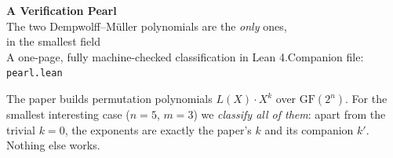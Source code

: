 \documentclass[11pt]{article}
\newcommand{\GF}[1]{\mathrm{GF}(#1)}
\begin{document}
\begin{center}
{\LARGE\bfseries\color{cA} A Verification Pearl}\\[2mm]
{\large\color{ink} The two Dempwolff--M\"uller polynomials are the \emph{only} ones,\\
in the smallest field}\\[3mm]
{\small A one-page, fully machine-checked classification in Lean 4.\quad Companion file: \texttt{pearl.lean}}
\end{center}

\vspace{2mm}

\begin{center}
\end{center}

\vspace{1mm}
\noindent
The paper builds permutation polynomials $L(X)\cdot X^{k}$ over $\GF{2^n}$.
For the smallest interesting case ($n=5$, $m=3$) we \emph{classify all of them}:
apart from the trivial $k=0$, the exponents are exactly the paper's $k$ and its
companion $k'$. Nothing else works.
\end{document}
